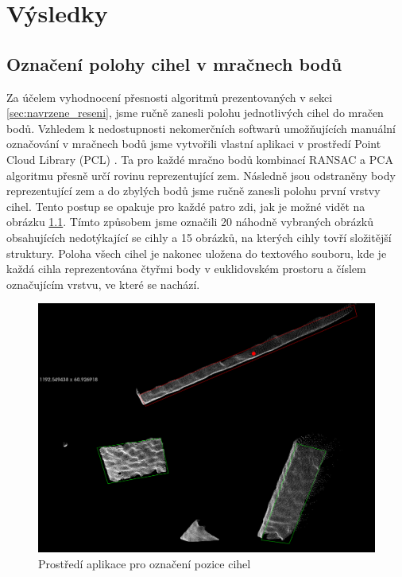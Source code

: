 \documentclass[twoside]{ctuthesis}
\begin{document}


\chapter{Výsledky}
\label{sec:výsledky}
\section{Označení polohy cihel v mračnech bodů}
Za účelem vyhodnocení přesnosti algoritmů prezentovaných v sekci \ref{sec:navrzene_reseni}, jsme ručně zanesli polohu jednotlivých cihel do mračen bodů. Vzhledem k nedostupnosti nekomerčních softwarů umožňujících manuální označování v mračnech bodů jsme vytvořili vlastní aplikaci v prostředí Point Cloud Library (PCL) \cite{pcl}. Ta pro každé mračno bodů kombinací RANSAC a PCA algoritmu přesně určí rovinu reprezentující zem. Následně jsou odstraněny body reprezentující zem a do zbylých bodů jsme ručně zanesli polohu první vrstvy cihel. Tento postup se opakuje pro každé patro zdi, jak je možné vidět na obrázku \ref{fig:labler}.
Tímto způsobem jsme označili 20 náhodně vybraných obrázků obsahujících nedotýkající se cihly a 15 obrázků, na kterých cihly tovří složitější struktury. Poloha všech cihel je nakonec uložena do textového souboru, kde je každá cihla reprezentována čtyřmi body v euklidovském prostoru a číslem označujícím vrstvu, ve které se nachází.
\begin{figure}[h]
    \centering
    \includegraphics[width = 0.8\linewidth]{pictures/labelr.png}
    \caption{Prostředí aplikace pro označení pozice cihel}
    \label{fig:labler}
\end{figure}
\end{document}
